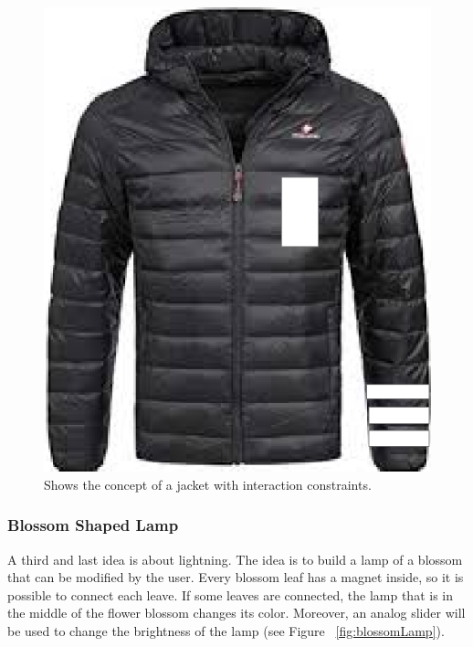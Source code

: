 \documentclass[04_projectProcess.tex]{subfiles}
\begin{document}
    \begin{figure}[h!]
        \centering
        \includegraphics[scale=0.2]{images/projectideas/jacket.png}
        \caption{Shows the concept of a jacket with interaction constraints.}
        \label{fig:jacketIdea}
    \end{figure}

    \subsubsection{Blossom Shaped Lamp}
    \label{BlossomShapedLamp}
    \begin{flushleft}
        A third and last idea is about lightning. The idea is to build a lamp of a blossom that can be 
        modified by the user. Every blossom leaf has a magnet inside, so it is possible to connect each 
        leave. If some leaves are connected, the lamp that is in the middle of the flower blossom changes 
        its color. Moreover, an analog slider will be used to change the brightness of the lamp (see Figure ~\ref{fig:blossomLamp}).
    \end{flushleft}
\end{document}
